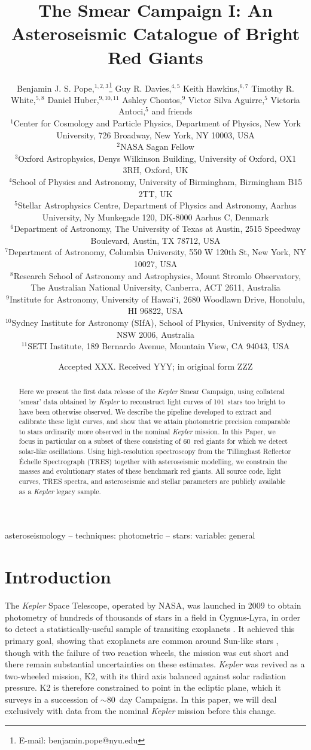 \documentclass[a4paper,fleqn,usenatbib]{mnras}
\title[The Kepler Smear Campaign]{The \kepler Smear Campaign I: An Asteroseismic Catalogue of Bright Red Giants}
\author[B. J. S. Pope et al.]{Benjamin J. S. Pope,$^{1,2,3}$\thanks{E-mail: benjamin.pope@nyu.edu}
Guy R. Davies,$^{4,5}$
Keith Hawkins,$^{6,7}$
Timothy R. White,$^{5,8}$\newauthor
Daniel Huber,$^{9,10,11}$
Ashley Chontos,$^{9}$
Victor Silva Aguirre,$^{5}$
Victoria Antoci,$^{5}$ and friends
\\
$^{1}$Center for Cosmology and Particle Physics, Department of Physics, New York University, 726 Broadway, New York, NY 10003, USA\\
$^{2}$NASA Sagan Fellow\\
$^{3}$Oxford Astrophysics, Denys Wilkinson Building, University of Oxford, OX1 3RH, Oxford, UK\\
$^{4}$School of Physics and Astronomy, University of Birmingham, Birmingham B15 2TT, UK\\
$^{5}$Stellar Astrophysics Centre, Department of Physics and Astronomy, Aarhus University, Ny Munkegade 120, DK-8000 Aarhus C, Denmark\\
$^{6}$Department of Astronomy, The University of Texas at Austin, 2515 Speedway Boulevard, Austin, TX 78712, USA\\
$^{7}$Department of Astronomy, Columbia University, 550 W 120th St, New York, NY 10027, USA\\
$^{8}$Research School of Astronomy and Astrophysics, Mount Stromlo Observatory, The Australian National University, Canberra, ACT 2611, Australia\\
$^{9}$Institute for Astronomy, University of Hawai‘i, 2680 Woodlawn Drive, Honolulu, HI 96822, USA\\
$^{10}$Sydney Institute for Astronomy (SIfA), School of Physics, University of Sydney, NSW 2006, Australia\\
$^{11}$SETI Institute, 189 Bernardo Avenue, Mountain View, CA 94043, USA
}
\date{Accepted XXX. Received YYY; in original form ZZZ}
\newcommand{\kepler}{\emph{Kepler}\xspace}
\begin{document}
\label{firstpage}
\pagerange{\pageref{firstpage}--\pageref{lastpage}}
\maketitle

\begin{abstract}
Here we present the first data release of the \kepler Smear Campaign, using collateral `smear' data obtained by \kepler to reconstruct light curves of 101~stars too bright to have been otherwise observed. We describe the pipeline developed to extract and calibrate these light curves, and show that we attain photometric precision comparable to stars ordinarily more observed in the nominal \kepler mission. In this Paper, we focus in particular on a subset of these consisting of 60~red giants for which we detect solar-like oscillations. Using high-resolution spectroscopy from the Tillinghast Reflector \'{E}chelle Spectrograph (TRES) together with asteroseismic modelling, we constrain the masses and evolutionary states of these benchmark red giants. All source code, light curves, TRES spectra, and asteroseismic and stellar parameters are publicly available as a \kepler legacy sample.
\end{abstract}

\begin{keywords}
asteroseismology -- techniques: photometric -- stars: variable: general
\end{keywords}



\section{Introduction}
\label{intro}

The \kepler Space Telescope, operated by NASA, was launched in 2009 to obtain photometry of hundreds of thousands of stars in a field in Cygnus-Lyra, in order to detect a statistically-useful sample of transiting exoplanets \citep{2010Sci...327..977B}. It achieved this primary goal, showing that exoplanets are common around Sun-like stars \citep{2013ApJ...766...81F,2013PNAS..11019273P,2014ApJ...795...64F}, though with the failure of two reaction wheels, the mission was cut short and there remain substantial uncertainties on these estimates. \kepler was revived as a two-wheeled mission, K2, with its third axis balanced against solar radiation pressure. K2 is therefore constrained to point in the ecliptic plane, which it surveys in a succession of $\sim 80$~day Campaigns. In this paper, we will deal exclusively with data from the nominal \kepler mission before this change.
\end{document}
